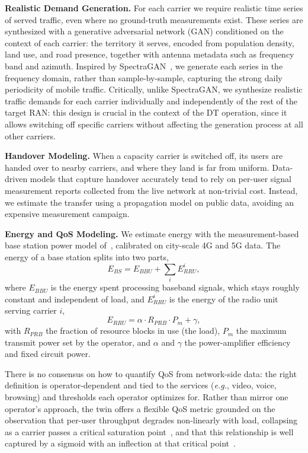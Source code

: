 \documentclass[sigconf, 10pt]{acmart}
\newcommand{\eg}{\textit{e.g.},\xspace}
\begin{document}
\noindent\textbf{Realistic Demand Generation.}
For each carrier we require realistic time series of served traffic, even where no ground-truth measurements exist. These series are synthesized with a generative adversarial network (GAN) conditioned on the context of each carrier: the territory it serves, encoded from population density, land use, and road presence, together with antenna metadata such as frequency band and azimuth. Inspired by SpectraGAN~\cite{xu2021spectragan}, we generate each series in the frequency domain, rather than sample-by-sample, capturing the strong daily periodicity of mobile traffic. Critically, unlike SpectraGAN, we synthesize realistic traffic demands for each carrier individually and independently of the rest of the target RAN: this design is crucial in the context of the \ac{DT} operation, since it allows switching off specific carriers without affecting the generation process at all other carriers.


\noindent\textbf{Handover Modeling.}
When a capacity carrier is switched off, its users are handed over to nearby carriers, and where they land is far from uniform. Data-driven models that capture handover accurately tend to rely on per-user signal measurement reports collected from the live network at non-trivial cost. Instead, we estimate the transfer using a 
propagation model on public data, avoiding 
an expensive measurement campaign.

\noindent\textbf{Energy and \ac{QoS} Modeling.}
We estimate energy with the measurement-based base station
power model of~\cite{energy_consumption_formula}, calibrated on city-scale 4G and 5G
data. 
The energy of a base station splits into two parts,
\begin{equation}
  E_{BS} = E_{BBU} + \sum_{i} E^{i}_{RRU},
  \label{eq:e_bs}
\end{equation}
where $E_{BBU}$ is the energy spent processing baseband signals, which stays roughly constant and independent of load, and $E^{i}_{RRU}$ is the energy of the radio unit serving carrier $i$,
\begin{equation}
  E_{RRU} = \alpha \cdot R_{PRB} \cdot P_{m} + \gamma,
  \label{eq:e_rru}
\end{equation}
with $R_{PRB}$ the fraction of resource blocks in use (the load), $P_{m}$ the maximum transmit power set by the operator, and $\alpha$ and $\gamma$ the power-amplifier efficiency and fixed circuit power. 

There is no consensus on how to quantify \ac{QoS} from network-side data: the right definition is operator-dependent and tied to the services (\eg video, voice, browsing) and thresholds each operator optimizes for. Rather than mirror one operator's approach, the twin offers a flexible \ac{QoS} metric grounded on the observation that per-user throughput degrades non-linearly with load, collapsing as a carrier passes a critical saturation point~\cite{bonald2003wireless}, and that this relationship is well captured by a sigmoid with an inflection at that critical point~\cite{lee2014qoe}. 
\end{document}
